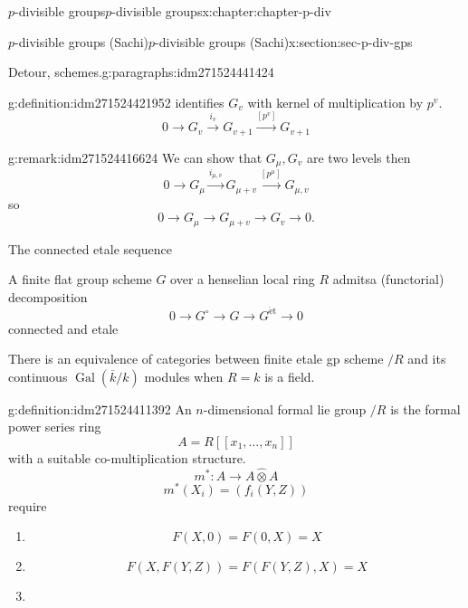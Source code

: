 \documentclass[oneside,10pt,]{book}
\numberwithin{equation}{section}
\newcommand{\lb}{[}
\newcommand{\rb}{]}
\newcommand{\et}{\mathrm{\acute{e}t}}
\newcommand{\absgal}[1]{\operatorname{Gal}(\overline{#1}/#1)}
\begin{document}
\begin{chapterptx}{\(p\)-divisible groups}{}{\(p\)-divisible groups}{}{}{x:chapter:chapter-p-div}
\begin{sectionptx}{\(p\)-divisible groups (Sachi)}{}{\(p\)-divisible groups (Sachi)}{}{}{x:section:sec-p-div-gps}
\begin{paragraphs}{Detour, schemes.}{g:paragraphs:idm271524441424}
\begin{definition}{}{g:definition:idm271524421952}
identifies \(G_v\) with kernel of multiplication by \(p^v\).%
\begin{equation*}
0 \to G_v \xrightarrow{i_v} G_{v+1} \xrightarrow{[p^v]} G_{v+1}
\end{equation*}
%
\end{definition}
\begin{remark}{}{g:remark:idm271524416624}%
We can show that \(G_\mu,G_v\) are two levels then%
\begin{equation*}
0 \to G_\mu \xrightarrow{i_{\mu, v}} G_{\mu +v } \xrightarrow{[p^\mu]} G_{\mu,v}
\end{equation*}
so%
\begin{equation*}
0 \to G_\mu \to G_{\mu + v}  \to G_v \to 0\text{.}
\end{equation*}
%
\end{remark}
The connected etale sequence%
\par
A finite flat group scheme \(G\) over a henselian local ring \(R\) admitsa (functorial) decomposition%
\begin{equation*}
0  \to G^\circ \to G \to G^\et \to 0
\end{equation*}
connected and etale%
\par
There is an equivalence of categories between finite etale gp scheme \(/R\) and its continuous \(\absgal k\) modules when \(R = k\) is a field.%
\begin{definition}{}{g:definition:idm271524411392}%
An \(n\)-dimensional formal lie group \(/R\) is the formal power series ring%
\begin{equation*}
A = R\lb \lb x_1, \ldots, x_n \rb\rb
\end{equation*}
with a suitable co-multiplication structure.%
\begin{equation*}
m^* \colon A \to A\widehat \otimes A
\end{equation*}
%
\begin{equation*}
m^*(X_i) = (f_i(Y,Z))
\end{equation*}
require%
\begin{enumerate}
\item{}%
\begin{equation*}
F(X,0) = F(0,X) = X
\end{equation*}
%
\item{}%
\begin{equation*}
F(X,F(Y,Z)) = F(F(Y,Z),X) = X
\end{equation*}
%
\item{}%
\begin{equation*}

\end{equation*}
\end{enumerate}
\end{definition}
\end{paragraphs}
\end{sectionptx}
\end{chapterptx}
\end{document}
